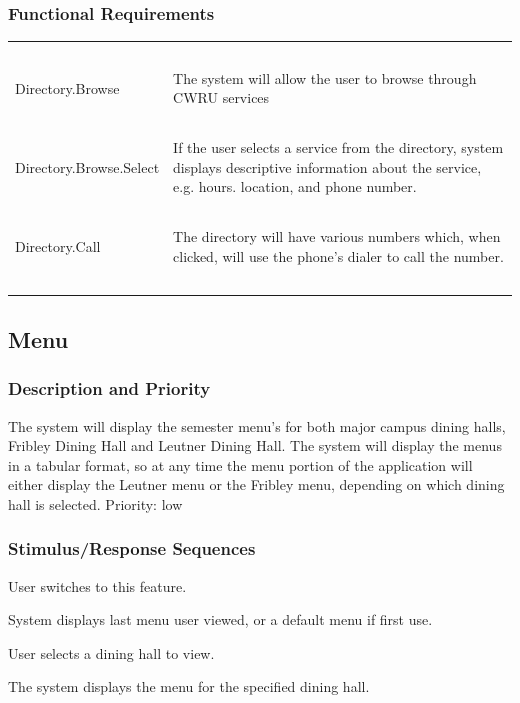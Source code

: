 \documentclass[pdftex,12pt,letter]{article}
\begin{document}
\subsubsection{Functional Requirements}
\begin{table}[!h]
\begin{tabularx}{\textwidth }[t]{|l Y|}
\hline
~&~\\
Directory.Browse & The system will allow the user to browse through CWRU services\\ 
~&~\\
Directory.Browse.Select & If the user selects a service from the directory, system displays descriptive information about the service, e.g. hours. location, and phone number.\\
~&~\\
Directory.Call & The directory will have various numbers which, when clicked, will use the phone's dialer to call the number.\\
~&~\\
\hline
\end{tabularx}
\end{table}
\FloatBarrier
\subsection{Menu}
\subsubsection{Description and Priority}
The system will display the semester menu's for both major campus dining halls, Fribley Dining Hall and Leutner Dining Hall. The system will display the menus in a tabular format, so at any time the menu portion of the application will either display the Leutner menu or the Fribley menu, depending on which dining hall is selected. Priority: low
\subsubsection{Stimulus/Response Sequences}
\begin{description}\itemsep1pt
\item[Stimulus:] User switches to this feature.
\item[Response:] System displays last menu user viewed, or a default menu if first use.
\item[Stimulus:] User selects a dining hall to view.
\item[Response:] The system displays the menu for the specified dining hall.
\end{description}
\end{document}
